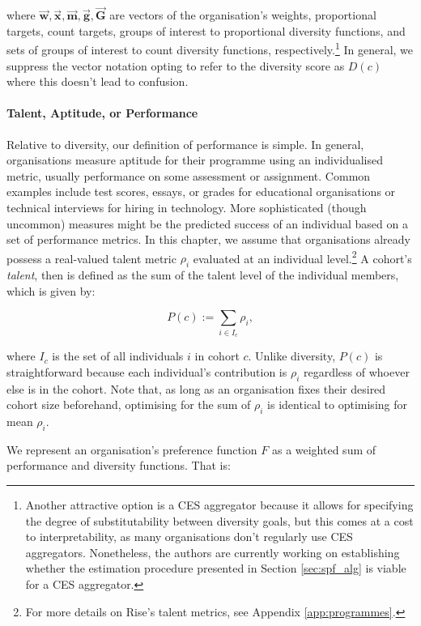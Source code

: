 \noindent where $\vec{\mathbf{w}},\vec{\mathbf{x}}, \vec{\mathbf{m}}, \vec{\mathbf{g}}, \vec{\mathbf{G}}$ are vectors of the organisation's weights, proportional targets, count targets, groups of interest to proportional diversity functions, and sets of groups of interest to count diversity functions, respectively.\footnote{Another attractive option is a CES aggregator because it allows for specifying the degree of substitutability between diversity goals, but this comes at a cost to interpretability, as many organisations don't regularly use CES aggregators. Nonetheless, the authors are currently working on establishing whether the estimation procedure presented in Section \ref{sec:spf_alg} is viable for a CES aggregator.} In general, we suppress the vector notation opting to refer to the diversity score as $D(c)$ where this doesn't lead to confusion.

\paragraph{Talent, Aptitude, or Performance} Relative to diversity, our definition of performance is simple. In general, organisations measure aptitude for their programme using an individualised metric, usually performance on some assessment or assignment. Common examples include test scores, essays, or grades for educational organisations or technical interviews for hiring in technology. More sophisticated (though uncommon) measures might be the predicted success of an individual based on a set of performance metrics. In this chapter, we assume that organisations already possess a real-valued talent metric $\rho_i$ evaluated at an individual level.\footnote{For more details on Rise's talent metrics, see Appendix \ref{app:programmes}.} A cohort's \emph{talent}, then is defined as the sum of the talent level of the individual members, which is given by:

\begin{equation}
P(c) := \sum_{i \in I_c}\rho_i,
\end{equation}

\noindent where $I_c$ is the set of all individuals $i$ in cohort $c$. Unlike diversity, $P(c)$ is straightforward because each individual's contribution is $\rho_i$ regardless of whoever else is in the cohort. Note that, as long as an organisation fixes their desired cohort size beforehand, optimising for the sum of $\rho_i$ is identical to optimising for mean $\rho_i$.

We represent an organisation's preference function $F$ as a weighted sum of performance and diversity functions. That is:


